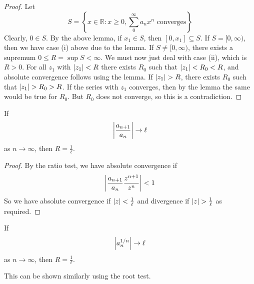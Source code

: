 \begin{proof}
	Let
	\[
		S = \left\{ x \in \mathbb R \colon x \geq 0, \sum_0^\infty a_n x^n \text{ converges} \right\}
	\]
	Clearly, \(0 \in S\).
	By the above lemma, if \(x_1 \in S\), then \([0, x_1] \subseteq S\).
	If \(S = [0, \infty)\), then we have case (i) above due to the lemma.
	If \(S \neq [0, \infty)\), there exists a supremum \(0 \leq R = \sup S < \infty\).
	We must now just deal with case (ii), which is \(R > 0\).
	For all \(z_1\) with \(\abs{z_1} < R\) there exists \(R_0\) such that \(\abs{z_1} < R_0 < R\), and absolute convergence follows using the lemma.
	If \(\abs{z_1} > R\), there exists \(R_0\) such that \(\abs{z_1} > R_0 > R\).
	If the series with \(z_1\) converges, then by the lemma the same would be true for \(R_0\).
	But \(R_0\) does not converge, so this is a contradiction.
\end{proof}

\begin{lemma}
	If
	\[
		\abs{\frac{a_{n+1}}{a_n}} \to \ell
	\]
	as \(n \to \infty\), then \(R = \frac{1}{\ell}\).
\end{lemma}
\begin{proof}
	By the ratio test, we have absolute convergence if
	\[
		\abs{\frac{a_{n+1}}{a_n} \frac{z^{n+1}}{z^n}} < 1
	\]
	So we have absolute convergence if \(\abs{z} < \frac{1}{\ell}\) and divergence if \(\abs{z} > \frac{1}{\ell}\) as required.
\end{proof}
\begin{lemma}
	If
	\[
		\abs{a_n^{1/n}} \to \ell
	\]
	as \(n \to \infty\), then \(R = \frac{1}{\ell}\).
\end{lemma}
\noindent This can be shown similarly using the root test.

